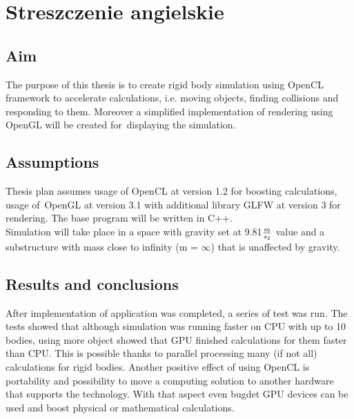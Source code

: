 \chapter*{Streszczenie angielskie}
\section*{Aim}
The purpose of this thesis is to create rigid body simulation using OpenCL framework to accelerate calculations, i.e. moving objects, finding collisions and responding to them. Moreover a simplified implementation of rendering using OpenGL will be created for~displaying the simulation.
\section*{Assumptions}
Thesis plan assumes usage of OpenCL at version 1.2 for boosting calculations, usage of~OpenGL at version 3.1 with additional library GLFW at version 3 for rendering. The base program will be written in C++.\\
Simulation will take place in a space with gravity set at 9.81$m \over s_2$ value and a substructure with mass close to infinity (m = $\infty$) that is unaffected by gravity.
\section*{Results and conclusions}
After implementation of application was completed, a series of test was run. The tests showed that although simulation was running faster on CPU with up to 10 bodies, using more object showed that GPU finished calculations for them faster than CPU. This is possible thanks to parallel processing many (if not all) calculations for rigid bodies. Another positive effect of using OpenCL is portability and possibility to move a computing solution to another hardware that supports the technology. With that aspect even bugdet GPU devices can be used and boost physical or mathematical calculations.
